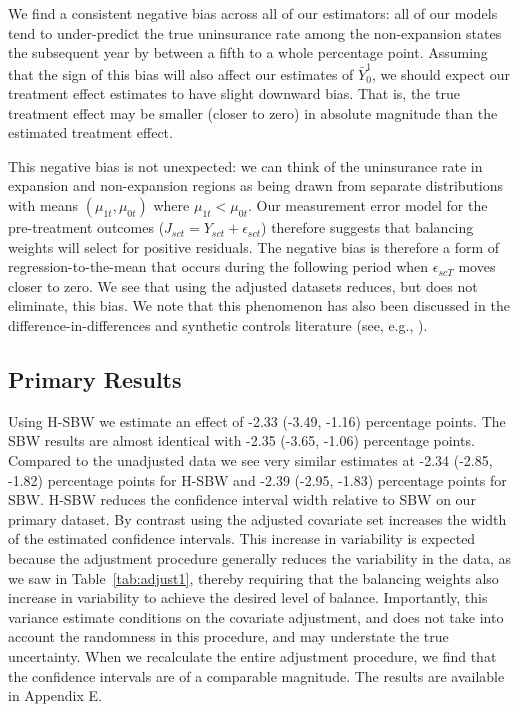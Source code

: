 \documentclass[aoas]{imsart}
\theoremstyle{plain}
\theoremstyle{remark}
\begin{document}
We find a consistent negative bias across all of our estimators: all of our models tend to under-predict the true uninsurance rate among the non-expansion states the subsequent year by between a fifth to a whole percentage point. Assuming that the sign of this bias will also affect our estimates of $\bar{Y}^1_0$, we should expect our treatment effect estimates to have slight downward bias. That is, the true treatment effect may be smaller (closer to zero) in absolute magnitude than the estimated treatment effect. 

This negative bias is not unexpected: we can think of the uninsurance rate in expansion and non-expansion regions as being drawn from separate distributions with means $(\mu_{1t}, \mu_{0t})$ where $\mu_{1t} < \mu_{0t}$. Our measurement error model for the pre-treatment outcomes ($J_{sct} = Y_{sct} + \epsilon_{sct}$) therefore suggests that balancing weights will select for positive residuals. The negative bias is therefore a form of regression-to-the-mean that occurs during the following period when $\epsilon_{scT}$ moves closer to zero. We see that using the adjusted datasets reduces, but does not eliminate, this bias. We note that this phenomenon has also been discussed in the difference-in-differences and synthetic controls literature (see, e.g., \cite{daw2018matching}). 

\subsection{Primary Results}

Using H-SBW we estimate an effect of -2.33 (-3.49, -1.16) percentage points. The SBW results are almost identical with -2.35 (-3.65, -1.06) percentage points. Compared to the unadjusted data we see very similar estimates at -2.34 (-2.85, -1.82) percentage points for H-SBW and -2.39 (-2.95, -1.83) percentage points for SBW. H-SBW reduces the confidence interval width relative to SBW on our primary dataset. By contrast using the adjusted covariate set increases the width of the estimated confidence intervals. This increase in variability is expected because the adjustment procedure generally reduces the variability in the data, as we saw in Table~\ref{tab:adjust1}, thereby requiring that the balancing weights also increase in variability to achieve the desired level of balance. Importantly, this variance estimate conditions on the covariate adjustment, and does not take into account the randomness in this procedure, and may understate the true uncertainty. When we recalculate the entire adjustment procedure, we find that the confidence intervals are of a comparable magnitude. The results are available in Appendix E.
\end{document}

